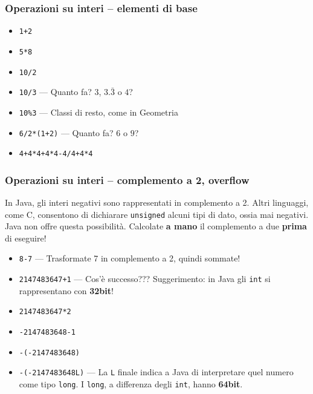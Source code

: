 \documentclass{beamer}
\begin{document}
\begin{frame}
\frametitle{Operazioni su interi -- elementi di base}
\begin{itemize}
 \item \texttt{1+2}
 \item \texttt{5*8}
 \item \texttt{10/2}
 \item \texttt{10/3} --- Quanto fa? $3$, $3.\bar{3}$ o $4$?
 \item \texttt{10\%3} --- Classi di resto, come in Geometria
 \item \texttt{6/2*(1+2)} --- Quanto fa? $6$ o $9$?
 \item \texttt{4+4*4+4*4-4/4+4*4}
\end{itemize}
\end{frame}

\begin{frame}
\frametitle{Operazioni su interi -- complemento a 2, overflow}
In Java, gli interi negativi sono rappresentati in complemento a 2. Altri linguaggi, come C, consentono di dichiarare \texttt{unsigned} alcuni tipi di dato, ossia mai negativi. Java non offre questa possibilità. Calcolate \textbf{a mano} il complemento a due \textbf{prima} di eseguire!
\begin{itemize}
 \item \texttt{8-7} --- Trasformate 7 in complemento a 2, quindi sommate!
 \item \texttt{2147483647+1} --- Cos'è successo??? Suggerimento: in Java gli \texttt{int} si rappresentano con \textbf{32bit}!
 \item \texttt{2147483647*2}
 \item \texttt{-2147483648-1}
 \item \texttt{-(-2147483648)}
 \item \texttt{-(-2147483648L)} --- La \texttt{L} finale indica a Java di interpretare quel numero come tipo \texttt{long}. I \texttt{long}, a differenza degli \texttt{int}, hanno \textbf{64bit}.
\end{itemize}
\end{frame}
\end{document}
